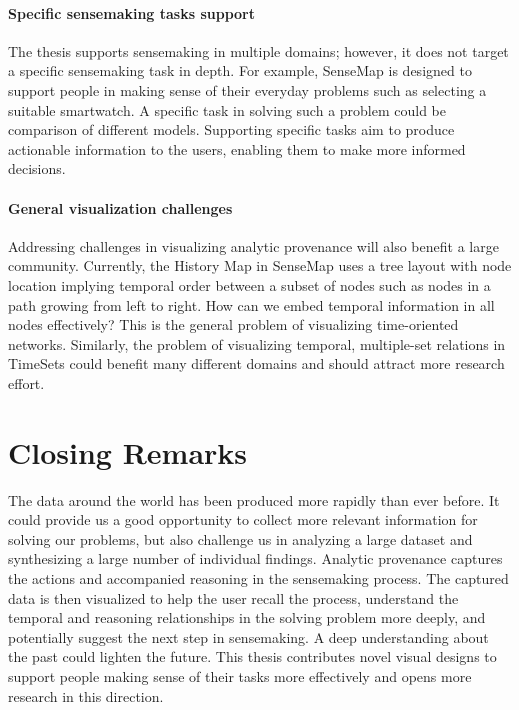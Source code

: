 \paragraph{Specific sensemaking tasks support}
The thesis supports sensemaking in multiple domains; however, it does not target a specific sensemaking task in depth. For example, SenseMap is designed to support people in making sense of their everyday problems such as selecting a suitable smartwatch. A specific task in solving such a problem could be comparison of different models. Supporting specific tasks aim to produce actionable information to the users, enabling them to make more informed decisions.

\paragraph{General visualization challenges}
Addressing challenges in visualizing analytic provenance will also benefit a large community. Currently, the History Map in SenseMap uses a tree layout with node location implying temporal order between a subset of nodes such as nodes in a path growing from left to right. How can we embed temporal information in all nodes effectively? This is the general problem of visualizing time-oriented networks. Similarly, the problem of visualizing temporal, multiple-set relations in TimeSets could benefit many different domains and should attract more research effort.

\section{Closing Remarks}
The data around the world has been produced more rapidly than ever before. It could provide us a good opportunity to collect more relevant information for solving our problems, but also challenge us in analyzing a large dataset and synthesizing a large number of individual findings. Analytic provenance captures the actions and accompanied reasoning in the sensemaking process. The captured data is then visualized to help the user recall the process, understand the temporal and reasoning relationships in the solving problem more deeply, and potentially suggest the next step in sensemaking. A deep understanding about the past could lighten the future. This thesis contributes novel visual designs to support people making sense of their tasks more effectively and opens more research in this direction.